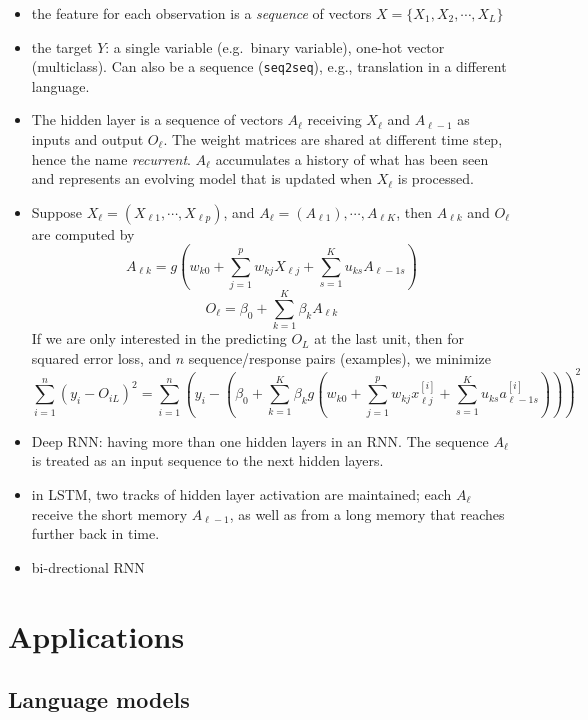 \documentclass[
  letterpaper,
  DIV=11,
  numbers=noendperiod]{scrreprt}
\begin{document}
\begin{itemize}
\item
  the feature for each observation is a \emph{sequence} of vectors
  \(X=\{X_1, X_2, \cdots, X_L \}\)
\item
  the target \(Y\): a single variable (e.g.~binary variable), one-hot
  vector (multiclass). Can also be a sequence (\texttt{seq2seq}), e.g.,
  translation in a different language.
\item
  The hidden layer is a sequence of vectors \(A_\ell\) receiving
  \(X_\ell\) and \(A_{\ell-1}\) as inputs and output \(O_\ell\). The
  weight matrices are shared at different time step, hence the name
  \emph{recurrent}. \(A_\ell\) accumulates a history of what has been
  seen and represents an evolving model that is updated when \(X_\ell\)
  is processed.
\item
  Suppose \(X_\ell=(X_{\ell 1},\cdots, X_{\ell p} )\), and
  \(A_\ell=(A_{\ell 1}), \cdots, A_{\ell K}\), then \(A_{\ell k}\) and
  \(O_\ell\) are computed by \[
  A_{\ell k} = g \left(w_{k0} + \sum_{j=1}^p w_{kj}X_{\ell j} + \sum_{s=1}^K u_{ks}A_{\ell-1 s}   \right)
  \] \[
  O_\ell = \beta_0 + \sum_{k=1}^{K} \beta_k A_{\ell k}
  \] If we are only interested in the predicting \(O_L\) at the last
  unit, then for squared error loss, and \(n\) sequence/response pairs
  (examples), we minimize \[
  \sum_{i=1}^n (y_i-O_{iL})^2=\sum_{i=1}^n \left( y_i- ( \beta_0+ \sum_{k=1}^K \beta_k g(w_{k0} + \sum_{j=1}^p w_{kj}x^{[i]}_{\ell j} + \sum_{s=1}^K u_{ks}a^{[i]}_{\ell-1 s} )) \right)^2
  \]
\item
  Deep RNN: having more than one hidden layers in an RNN. The sequence
  \(A_\ell\) is treated as an input sequence to the next hidden layers.
\item
  in LSTM, two tracks of hidden layer activation are maintained; each
  \(A_\ell\) receive the short memory \(A_{\ell -1}\), as well as from a
  long memory that reaches further back in time.
\item
  bi-drectional RNN
\end{itemize}

\section{Applications}\label{applications}

\subsection{Language models}\label{language-models}
\end{document}
